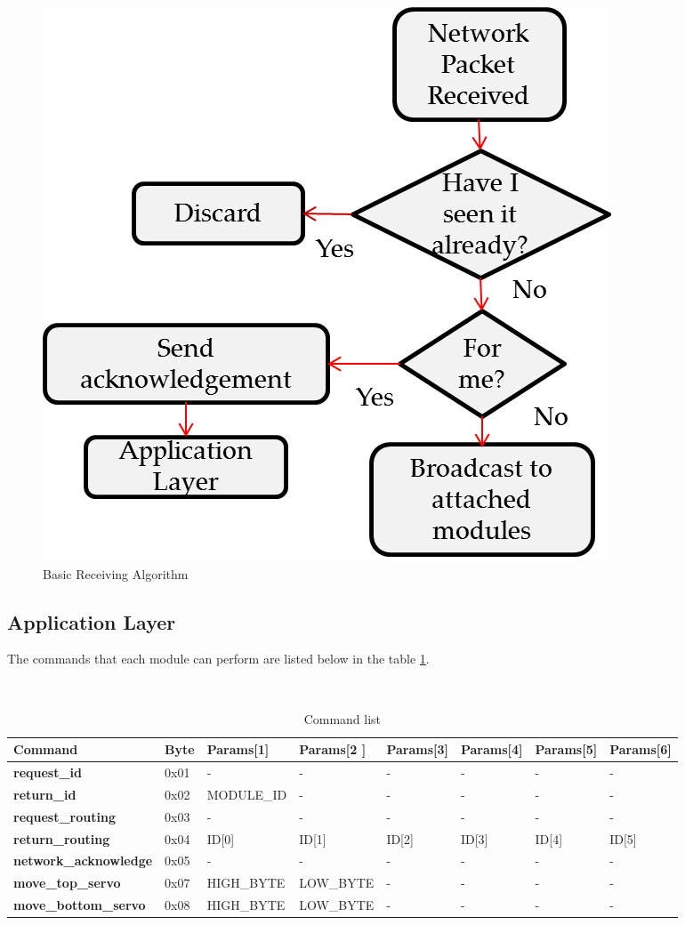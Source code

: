 \begin{figure}[htb]
\centering
\includegraphics[scale = 0.7]{figures/receive_algorithm.png}
\caption{Basic Receiving Algorithm}
\label{fig:receiving_algorithm}
\end{figure}

\subsection{Application Layer}
 The commands that each module can perform are listed below in the table \ref{tab:command_list}. 
\begin{table}
  {\scriptsize\tt
   \begin{tabular}{| l | l | l | l | l | l | l |  l |}
  \hline
   Command & Byte & Params[1] & Params[2 ] & Params[3] & Params[4] &Params[5] & Params[6]\\ \hline
   {\bf request\_id} & 0x01 & - & - & - &- &- & -\\ \hline
   {\bf return\_id}& 0x02 & MODULE\_ID & - & - &- &- & - \\ \hline
   {\bf request\_routing} & 0x03  & - & - & - &- &- & - \\ \hline
   {\bf return\_routing} & 0x04 & ID[0] & ID[1] & ID[2] & ID[3] & ID[4] & ID[5] \\ \hline
   {\bf network\_acknowledge} & 0x05  & - & - & - &- &- & - \\ \hline
   {\bf move\_top\_servo} & 0x07 & HIGH\_BYTE & LOW\_BYTE  & - &- &- & -  \\ \hline
    {\bf move\_bottom\_servo} & 0x08 & HIGH\_BYTE & LOW\_BYTE  & - &- &- & -  \\ \hline
   \hline
  \end{tabular}
   \caption{Command list}
    \label{tab:command_list}
	}
 \end{table}

